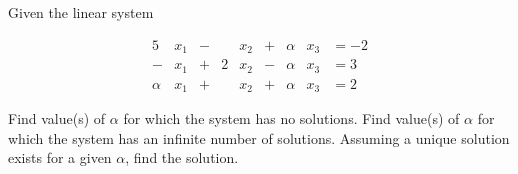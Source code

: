 \documentclass[../../../../Assignments]{subfiles}
\begin{document}
\begin{exercise}
    Given the linear system

    \begin{alignat*}{5}
                  &x_1 &{}-{}&  & x_2 &{}+{}& \alpha&x_3 &{}= -2 \\
               -{}&x_1 &{}+{}& 2& x_2 &{}-{}& \alpha&x_3 &{}=  3 \\
            \alpha&x_1 &{}+{}&  & x_2 &{}+{}& \alpha&x_3 &{}=  2
    \end{alignat*}

    \begin{tasks}
        \task Find value(s) of \(\alpha\) for which the system has no solutions.
        \task Find value(s) of \(\alpha\) for which the system has an infinite
            number of solutions.
        \task Assuming a unique solution exists for a given \(\alpha\), find the
            solution.
    \end{tasks}
\end{exercise}
\end{document}
